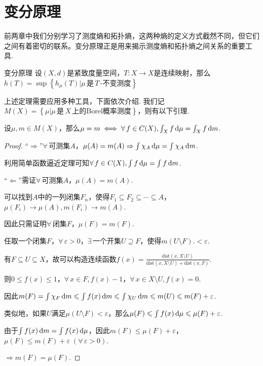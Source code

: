 \chapter{变分原理}

前两章中我们分别学习了测度熵和拓扑熵，这两种熵的定义方式截然不同，但它们之间有着密切的联系。变分原理正是用来揭示测度熵和拓扑熵之间关系的重要工具.

\begin{theorem}{变分原理}
    设$(X,d)$是紧致度量空间，$T:X\to X$是连续映射，那么$h(T)=\sup\left\{h_\mu(T)|\mu\,\text{是}\,T\,\text{-不变测度}\right\}$
\end{theorem}
上述定理需要应用多种工具，下面依次介绍.
我们记$M(X)=\left\{\mu|\mu\,\text{是}\, X\,\text{上的Borel概率测度}\right\}$，则有以下引理.
\begin{lemma}{}
    设$\mu,m\in M(X)$，那么$\mu=m\iff \forall\, f\in C(X),\int_X{f}\mathop{}\!\mathrm{d} \mu=\int_X{f}\mathop{}\!\mathrm{d} m$.
\end{lemma}
\begin{proof}
    “$\Rightarrow$”$\forall\, $可测集$A$，$\mu(A)=m(A)\Rightarrow \int\chi_A\mathop{}\!\mathrm{d}\mu=\int\chi_A\mathop{}\!\mathrm{d} m$.\par
    利用简单函数逼近定理可知$\forall\, f\in C(X),\int f\mathop{}\!\mathrm{d} \mu=\int f\mathop{}\!\mathrm{d} m$.\par
    “$\Leftarrow$”需证$\forall\,$可测集$A$，$\mu(A)=m(A)$.\par
    可以找到$A$中的一列闭集$F_n$，使得$F_1\subseteq F_2\subseteq\cdots\subseteq A$，$\mu(F_i)\to \mu(A),m(F_i)\to m(A)$.\par
    因此只需证明$\forall\,$闭集$F$，$\mu(F)=m(F)$.\par
    任取一个闭集$F$，$\forall\,\varepsilon>0$，$\exists\,$一个开集$U\supseteq F$，使得$m(U\setminus F).<\varepsilon$.\par
    有$F\subseteq U\subseteq X$，故可以构造连续函数$f(x)=\frac{\mathrm{dist}\left(x,X\setminus U\right)}{\mathrm{dist}\left(x,X\setminus U\right)+\mathrm{dist}\left(x,F\right)}$.\par
    则$0\leq f(x)\leq 1$，$\forall\, x\in F,f(x)-1$，$\forall\, x\in X\setminus U,f(x)=0$.\par
    因此$m(F)=\int\chi_F\mathop{}\!\mathrm{d} m\leqslant\int f(x)\mathop{}\!\mathrm{d} m\leqslant\int\chi_U\mathop{}\!\mathrm{d} m\leqslant m(U)\leqslant m(F)+\varepsilon$.\par
    类似地，如果$U$满足$\mu(U\setminus F)<\varepsilon$，那么$\mu(F)\leqslant \int f(x)\mathop{}\!\mathrm{d}\mu\leqslant\mu(F)+\varepsilon$.\par
    由于$\int f(x)\mathop{}\!\mathrm{d} m=\int f(x)\mathop{}\!\mathrm{d}\mu$，因此$m(F)\leq\mu(F)+\varepsilon$，$\mu(F)\leq m(F)+\varepsilon\;(\forall\,\varepsilon>0)$.\par
    $\Rightarrow m(F)=\mu(F)$.
\end{proof}

